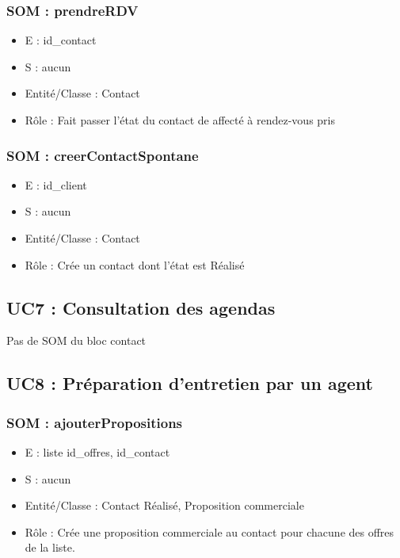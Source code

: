 \subsubsection{SOM : prendreRDV}
	\begin{itemize}
		\item E : id\_contact
		\item S : aucun
		\item Entité/Classe : Contact
		\item Rôle : Fait passer l’état du contact de affecté à rendez-vous pris
	\end{itemize}

\subsubsection{SOM : creerContactSpontane}
	\begin{itemize}
		\item E : id\_client
		\item S : aucun
		\item Entité/Classe : Contact
		\item Rôle : Crée un contact dont l’état est Réalisé
	\end{itemize}



\subsection{UC7 : Consultation des agendas}
Pas de SOM du bloc contact



\subsection{UC8 : Préparation d’entretien par un agent}
\subsubsection{SOM : ajouterPropositions}
	\begin{itemize}
		\item E : liste id\_offres, id\_contact
		\item S : aucun
		\item Entité/Classe : Contact Réalisé, Proposition commerciale
		\item Rôle : Crée une proposition commerciale au contact pour chacune des offres de la
	liste.
	\end{itemize}

